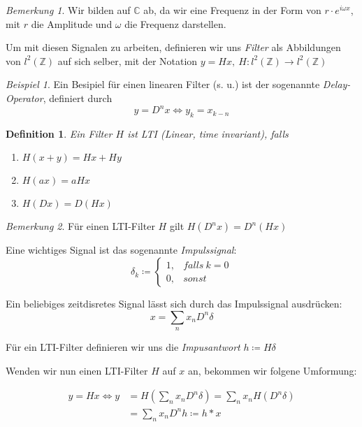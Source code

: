 \documentclass[]{scrartcl}
\theoremstyle{plain}
\newtheorem{defn}[theo]{Definition}
\theoremstyle{remark}
\newtheorem*{bsp}{Beispiel}
\newtheorem*{bem}{Bemerkung}
\begin{document}
    \begin{bem}
        Wir bilden auf $\mathbb{C}$ ab, da wir eine Frequenz in der Form von $r \cdot e^{i\omega x}$, mit $r$ die Amplitude und $\omega$ die Frequenz darstellen.
    \end{bem}

    Um mit diesen Signalen zu arbeiten, definieren wir uns \emph{Filter} als Abbildungen von $l^2(\mathbb{Z})$ auf sich selber, mit der Notation $y = Hx, \: H: l^2(\mathbb{Z}) \to l^2(\mathbb{Z})$

    \begin{bsp}
        Ein Besipiel für einen linearen Filter (s. u.) ist der sogenannte \emph{Delay-Operator}, definiert durch
        $$y = D^nx \Leftrightarrow y_k = x_{k-n}$$
    \end{bsp}

    \begin{defn}
        Ein Filter $H$ ist \emph{LTI} (Linear, time invariant), falls
        \begin{enumerate}[label=(\roman*)]
            \item $H(x + y) = Hx + Hy$
            \item $H(ax) = aHx \: $
            \item $H(Dx) = D(Hx) \: $
        \end{enumerate}
    \end{defn}

    \begin{bem}
        Für einen LTI-Filter $H$ gilt $H(D^nx)=D^n(Hx)$
    \end{bem}

    Eine wichtiges Signal ist das sogenannte \emph{Impulssignal}:
    $$\delta_k \coloneqq
    \begin{cases}
        1, &falls \: k=0\\
        0, &sonst    
    \end{cases} 
    $$

    Ein beliebiges zeitdisretes Signal lässt sich durch das Impulssignal ausdrücken:
    $$x = \sum_n x_n D^n \delta$$

    Für ein LTI-Filter definieren wir uns die \emph{Impusantwort} $h \coloneqq H\delta$

    Wenden wir nun einen LTI-Filter $H$ auf $x$ an, bekommen wir folgene Umformung:

    \begin{align*}
        y = Hx \Leftrightarrow y &= H(\sum_n x_n D^n \delta) = \sum_n x_n H (D^n \delta) \\
            &= \sum_n x_n D^n h \coloneqq h * x
    \end{align*}
\end{document}
